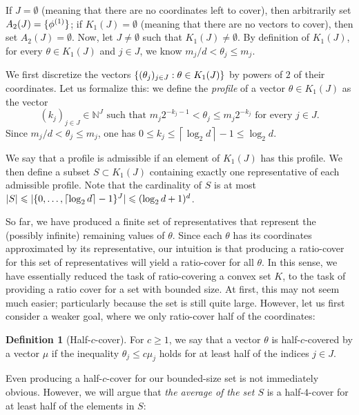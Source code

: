 \documentclass[11pt]{article}
\newcommand{\N}{\mathbb N}
\renewcommand{\leq}{\leqslant}
\renewcommand{\geq}{\geqslant}
\theoremstyle{definition}
\newtheorem{definition}{Definition}
\theoremstyle{remark}
\DeclarePairedDelimiter{\set}{\{}{\}}
\begin{document}
  If $J = \emptyset$ (meaning that there are no coordinates left to cover), then arbitrarily set $A_2 (J) = \set{\phi^{(1)}}$;
  if $K_1 (J) = \emptyset$ (meaning that there are no vectors to cover), then set $A_2 (J) = \emptyset$.
  Now, let $J \neq \emptyset$ such that $K_1 (J) \neq \emptyset$.
  By definition of $K_1 (J)$, for every $\theta \in K_1 (J)$ and $j \in J$, we know
  $m_j/d < \theta_j \leq m_j$.

  We first discretize the vectors $\set{(\theta_j)_{j \in J} : \theta \in K_1 (J)}$ by powers of $2$ of their coordinates.
  Let us formalize this: we define the \emph{profile} of a vector $\theta \in K_1 (J)$ as the vector 
  \[(k_j)_{j \in J} \in \N^{J}\textrm{ such that }m_j 2^{-k_j - 1} < \theta_j \leq m_j 2^{-k_j}\textrm{ for every }j \in J.\]
  Since $m_j/d < \theta_j \leq m_j$, one has $0 \leq k_j \leq \left\lceil \log_2 d \right\rceil - 1 \leq \log_2 d$.
  
  We say that a profile
  is admissible if an element of $K_1 (J)$ has this profile.
  We then define a subset $S \subset K_1 (J)$ containing exactly one representative of each admissible profile.
  Note that the cardinality of $S$ is at most $|S| \leq | \set{0, \dots, \left\lceil \log_2 d \right\rceil - 1}^{J}| \leq (\log_2 d + 1)^d$.

  So far, we have produced a finite set of representatives that represent the (possibly infinite) remaining values of $\theta$. Since each $\theta$ has its coordinates approximated by its representative, our intuition is that producing a ratio-cover for this set of representatives will yield a ratio-cover for all $\theta$.
  In this sense, we have essentially reduced the task of ratio-covering a convex set $K$, to the task of providing a ratio cover for a set with bounded size. At first, this may not seem much easier; particularly because the set is still quite large. However, let us first consider a weaker goal, where we only ratio-cover half of the coordinates:
  \begin{definition}[Half-$c$-cover]
      For $c \geq 1$, we say that a vector $\theta$ is half-$c$-covered by a vector $\mu$ if the inequality $\theta_j \leq c \mu_j$ holds for at least half of the indices $j \in J$.
  \end{definition}

  Even producing a half-$c$-cover for our bounded-size set is not immediately obvious. However, we will argue that \textit{the average of the set $S$} is a half-$4$-cover for at least half of the elements in $S$:
  
\end{document}
